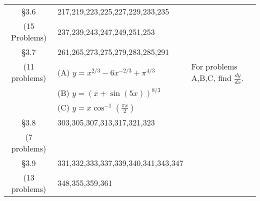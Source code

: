 \documentclass[11pt,fleqn]{article}
\begin{document}
\begin{tabularx}{\textwidth}{|c|| X | X | }
\S 3.6 &217,219,223,225,227,229,233,235&\\
(15 Problems)&237,239,243,247,249,251,253& \\ \hline

\S 3.7 &261,265,273,275,279,283,285,291&\\
(11 problems) &(A) $y=x^{2/3}-6x^{-2/3}+\pi^{4/3}$& For problems A,B,C, find $\frac{dy}{dx}$.\\ 
&(B) $y=(x+\sin(5x))^{8/3}$& \\
&(C) $y=x\cos^{-1}(\frac{\pi x }{2})$ & \\ \hline

\S 3.8 &303,305,307,313,317,321,323&\\ 
(7 problems) && \\ \hline

\S 3.9 &331,332,333,337,339,340,341,343,347&\\ 
(13 problems) &348,355,359,361& \\ \hline
\end{tabularx}
\vfill
\end{document}
